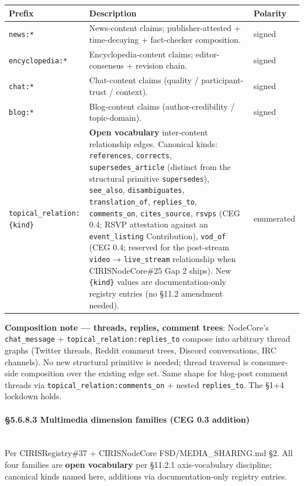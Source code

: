\documentclass[11pt]{article}
\begin{document}
{\footnotesize
\begin{longtable}{|p{5.33cm}|p{5.33cm}|p{5.33cm}|}\hline
\textbf{Prefix} & \textbf{Description} & \textbf{Polarity} \\ \hline\endhead
\texttt{news:*} & News-content claims; publisher-attested + time-decaying + fact-checker composition. & signed \\ \hline
\texttt{encyclopedia:*} & Encyclopedia-content claims; editor-consensus + revision chain. & signed \\ \hline
\texttt{chat:*} & Chat-content claims (quality / participant-trust / context). & signed \\ \hline
\texttt{blog:*} & Blog-content claims (author-credibility / topic-domain). & signed \\ \hline
\texttt{topical\_relation:\{kind\}} & \textbf{Open vocabulary} inter-content relationship edges. Canonical kinds: \texttt{references}, \texttt{corrects}, \texttt{supersedes\_article} (distinct from the structural primitive \texttt{supersedes}), \texttt{see\_also}, \texttt{disambiguates}, \texttt{translation\_of}, \texttt{replies\_to}, \texttt{comments\_on}, \texttt{cites\_source}, \texttt{rsvps} (CEG 0.4; RSVP attestation against an \texttt{event\_listing} Contribution), \texttt{vod\_of} (CEG 0.4; reserved for the post-stream \texttt{video} → \texttt{live\_stream} relationship when CIRISNodeCore\#25 Gap 2 ships). New \texttt{\{kind\}} values are documentation-only registry entries (no §11.2 amendment needed). & enumerated \\ \hline
\end{longtable}}


\textbf{Composition note — threads, replies, comment trees}: NodeCore's \texttt{chat\_message} + \texttt{topical\_relation:replies\_to} compose into arbitrary thread graphs (Twitter threads, Reddit comment trees, Discord conversations, IRC channels). No new structural primitive is needed; thread traversal is consumer-side composition over the existing edge set. Same shape for blog-post comment threads via \texttt{topical\_relation:comments\_on} + nested \texttt{replies\_to}. The §1+4 lockdown holds.


\paragraph{§5.6.8.3 Multimedia dimension families (CEG 0.3 addition)}\mbox{}\\


Per CIRISRegistry\#37 + CIRISNodeCore FSD/MEDIA\_SHARING.md §2. All four families are \textbf{open vocabulary} per §11.2.1 axis-vocabulary discipline; canonical kinds named here, additions via documentation-only registry entries.
\end{document}

